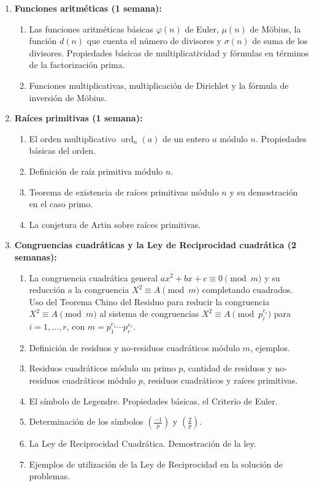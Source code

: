 \begin{refsection}
\begin{enumerate}
\item \textbf{Funciones aritméticas (1 semana):} 
\begin{enumerate}
    \item Las funciones aritméticas básicas $\varphi(n)$ de Euler, $\mu(n)$ de Möbius, la función $d(n)$ que cuenta el número de divisores y $\sigma(n)$ de suma de los divisores. Propiedades básicas de multiplicatividad y fórmulas en términos de la factorización prima.
    \item Funciones multiplicativas, multiplicación de Dirichlet y la fórmula de inversión de Möbius.
\end{enumerate}

\item \textbf{Raíces primitivas (1 semana):} 
\begin{enumerate}
    \item El orden multiplicativo $\operatorname{ord}_n(a)$ de un entero $a$ módulo $n$. Propiedades básicas del orden.
    \item Definición de raíz primitiva módulo $n$.
    \item Teorema de existencia de raíces primitivas módulo $n$ y su demostración en el caso primo.
    \item La conjetura de Artin sobre raíces primitivas.
\end{enumerate}

\item \textbf{Congruencias cuadráticas y la Ley de Reciprocidad cuadrática (2 semanas):} 
\begin{enumerate}
    \item La congruencia cuadrática general $ax^2 + bx + c \equiv 0 \pmod{m}$ y su reducción a la congruencia $X^2 \equiv A \pmod{m}$ completando cuadrados. Uso del Teorema Chino del Residuo para reducir la congruencia $X^2 \equiv A \pmod{m}$ al sistema de congruencias $X^2 \equiv A \pmod{p_i^{e_i}}$ para $i = 1, \dots, r$, con $m = p_1^{e_1} \cdots p_r^{e_r}$.
    \item Definición de residuos y no-residuos cuadráticos módulo $m$, ejemplos.
    \item Residuos cuadráticos módulo un primo $p$, cantidad de residuos y no-residuos cuadráticos módulo $p$, residuos cuadráticos y raíces primitivas.
    \item El símbolo de Legendre. Propiedades básicas, el Criterio de Euler.
    \item Determinación de los símbolos $\left( \frac{-1}{p} \right)$ y $\left( \frac{2}{p} \right)$.
    \item La Ley de Reciprocidad Cuadrática. Demostración de la ley.
    \item Ejemplos de utilización de la Ley de Reciprocidad en la solución de problemas.
\end{enumerate}



\end{enumerate}
\end{refsection}
